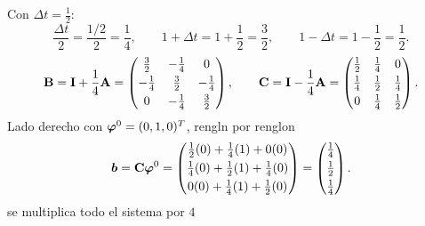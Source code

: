

Con $\Delta t = \frac12$:
\[
  \frac{\Delta t}{2} = \frac{1/2}{2} = \frac14, \qquad
  1 + \Delta t = 1 + \frac12 = \frac32, \qquad
  1 - \Delta t = 1 - \frac12 = \frac12 .
\]
\[
  \mathbf{B} = \mathbf{I} + \frac14\mathbf{A} =
  \begin{pmatrix} \frac32 & -\frac14 & 0\\[3pt] -\frac14 & \frac32 & -\frac14\\[3pt] 0 & -\frac14 & \frac32 \end{pmatrix},
  \qquad
  \mathbf{C} = \mathbf{I} - \frac14\mathbf{A} =
  \begin{pmatrix} \frac12 & \frac14 & 0\\[3pt] \frac14 & \frac12 & \frac14\\[3pt] 0 & \frac14 & \frac12 \end{pmatrix}.
\]
Lado derecho con $\bm{\varphi}^0 = (0, 1, 0)^T$, rengln por renglon
\[
  \bm{b} = \mathbf{C}\bm{\varphi}^0 =
  \begin{pmatrix}
    \frac12(0) + \frac14(1) + 0(0)\\[3pt]
    \frac14(0) + \frac12(1) + \frac14(0)\\[3pt]
    0(0) + \frac14(1) + \frac12(0)
  \end{pmatrix}
  = \begin{pmatrix} \frac14\\[3pt] \frac12\\[3pt] \frac14 \end{pmatrix}.
\]
se multiplica todo el sistema por $4$

